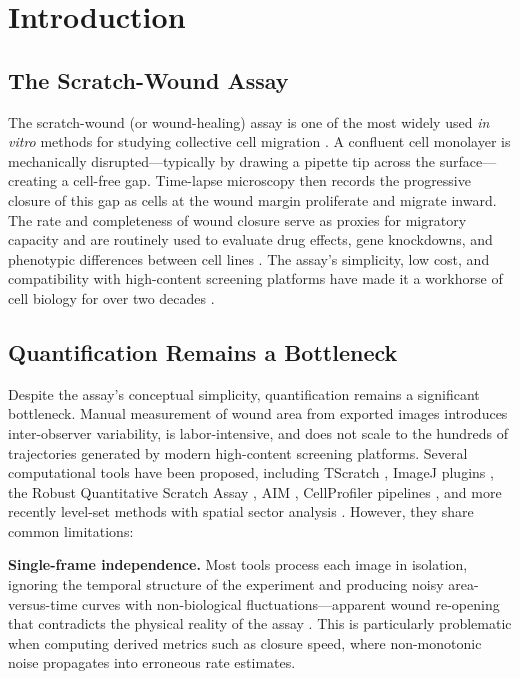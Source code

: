 \section{Introduction}

\subsection{The Scratch-Wound Assay}

The scratch-wound (or wound-healing) assay is one of the most widely used \textit{in vitro} methods for studying collective cell migration \citep{Liang2007,Jonkman2014,Grada2017}. A confluent cell monolayer is mechanically disrupted---typically by drawing a pipette tip across the surface---creating a cell-free gap. Time-lapse microscopy then records the progressive closure of this gap as cells at the wound margin proliferate and migrate inward. The rate and completeness of wound closure serve as proxies for migratory capacity and are routinely used to evaluate drug effects, gene knockdowns, and phenotypic differences between cell lines \citep{Yarrow2004,Ashby2012,Pinto2023}. The assay's simplicity, low cost, and compatibility with high-content screening platforms have made it a workhorse of cell biology for over two decades \citep{Stamm2016}.

\subsection{Quantification Remains a Bottleneck}

Despite the assay's conceptual simplicity, quantification remains a significant bottleneck. Manual measurement of wound area from exported images introduces inter-observer variability, is labor-intensive, and does not scale to the hundreds of trajectories generated by modern high-content screening platforms. Several computational tools have been proposed, including TScratch \citep{Gebaeck2009}, ImageJ plugins \citep{SuarezArnedo2020}, the Robust Quantitative Scratch Assay \citep{Vargas2016}, AIM \citep{NunesViana2017}, CellProfiler pipelines \citep{McQuin2018}, and more recently level-set methods with spatial sector analysis \citep{Martinotti2025}. However, they share common limitations:

\textbf{Single-frame independence.} Most tools process each image in isolation, ignoring the temporal structure of the experiment and producing noisy area-versus-time curves with non-biological fluctuations---apparent wound re-opening that contradicts the physical reality of the assay \citep{Treloar2013}. This is particularly problematic when computing derived metrics such as closure speed, where non-monotonic noise propagates into erroneous rate estimates.

